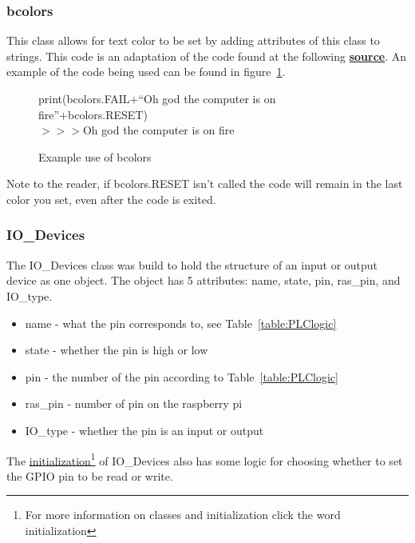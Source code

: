 \documentclass[titlepage]{article}
\begin{document}
\subsubsection{bcolors}
This class allows for text color to be set by adding attributes of this class to strings. This code is an adaptation of the code found at the following \textbf{\href{https://stackoverflow.com/questions/287871/how-to-print-colored-text-to-the-terminal}{source}}. An example of the code being used can be found in figure~\ref{fig:bcolors}.

\begin{center}
    \begin{figure}[h!]
        print(bcolors.FAIL+``Oh god the computer is on fire''+bcolors.RESET)\\
        $>$$>$$>${\color{red}Oh god the computer is on fire}
      \caption{Example use of bcolors}
      \label{fig:bcolors}
    \end{figure}
\end{center}

Note to the reader, if bcolors.RESET isn't called the code will remain in the last color you set, even after the code is exited.


\subsubsection{IO\_Devices}
The IO\_Devices class was build to hold the structure of an input or output device as one object. The object has 5 attributes: name, state, pin, ras\_pin, and  IO\_type.

\begin{itemize}
    \item name - what the pin corresponds to, see Table~\ref{table:PLClogic}
    \item state - whether the pin is high or low 
    \item pin - the number of the pin according to Table~\ref{table:PLClogic}
    \item ras\_pin - number of pin on the raspberry pi
    \item IO\_type - whether the pin is an input or output
\end{itemize}
The \href{https://www.w3schools.com/python/python_classes.asp}{initialization}\footnote{For more information on classes and initialization click the word initialization} of IO\_Devices also has some logic for choosing whether to set the GPIO pin to be read or write.\\
\end{document}
